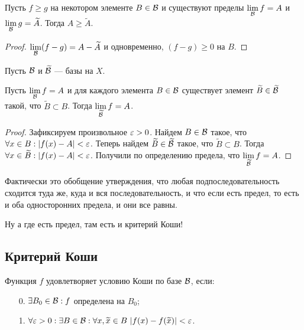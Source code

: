 \begin{Consequence}
Пусть $f \geq g$ на некотором элементе $B \in \mathcal{B}$ и существуют пределы $\lim\limits_{\mathcal{B}}f = A$ и $\lim\limits_{\mathcal{B}}g = \widetilde{A}$. Тогда $A \geq \widetilde{A}$.
\end{Consequence}
\begin{proof}
$\lim\limits_{\mathcal{B}}(f - g) = A - \widetilde{A}$ и одновременно, $(f - g) \geq 0$ на $B$.
\end{proof}

Пусть $\mathcal{B}$ и $\widetilde{\mathcal{B}}$ --- базы на $X$.
\begin{Statement}
Пусть $\lim\limits_{\mathcal{B}}f = A$ и для каждого элемента $B \in \mathcal{B}$ существует элемент $\widetilde{B} \in \widetilde{\mathcal{B}}$ такой, что $\widetilde{B} \subset B$. Тогда $\lim\limits_{\widetilde{\mathcal{B}}}f = A$.
\end{Statement}

\begin{proof}
Зафиксируем произвольное $\varepsilon > 0$. Найдем $B \in \mathcal{B}$ такое, что $\forall x \in B: |f(x) - A| < \varepsilon$.
Теперь найдем $\widetilde{B} \in \widetilde{\mathcal{B}}$ такое, что $\widetilde{B} \subset B$. Тогда $\forall x \in \widetilde{B}: |f(x) - A| < \varepsilon$. Получили по определению предела, что $\lim\limits_{\widetilde{\mathcal{B}}}f = A$.
\end{proof}

Фактически это обобщение утверждения, что любая подпоследовательность сходится туда же, куда и вся последовательность, и что если есть предел, то есть и оба односторонних предела, и они все равны.

Ну а где есть предел, там есть и критерий Коши!

\subsection{Критерий Коши}

\begin{Def}
Функция $f$ удовлетворяет условию Коши по базе $\mathcal{B}$, если:
\begin{itemize}
\item[0.] $\exists B_0 \in \mathcal{B}: f$ определена на $B_0$;
\item[1.] $\forall \varepsilon > 0: \exists B \in \mathcal{B}: \forall x, \widetilde{x} \in B\ |f(x) - f(\widetilde{x})| < \varepsilon$.
\end{itemize}
\end{Def}


